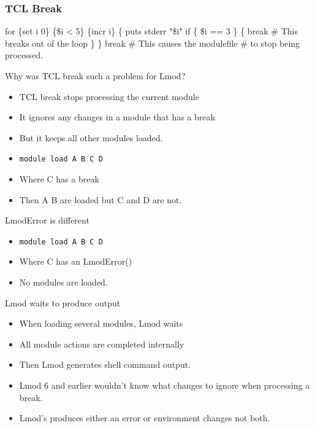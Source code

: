 \documentclass{beamer}
\begin{document}
\begin{frame}[fragile]
    \frametitle{TCL Break}
 {\small
   \begin{semiverbatim}
for \{set i 0\} \{\$i < 5\} \{incr i\} \{
  puts stderr "\$i"
  if \{ \$i == 3 \} \{
      break  # This breaks out of the loop
  \}
\}
break # This causes the modulefile
      # to stop being processed.       
    \end{semiverbatim}
}
\end{frame}

\begin{frame}{Why was TCL break such a problem for Lmod?}
  \begin{itemize}
    \item TCL break stops processing the current module
    \item It ignores any changes in a module that has a break
    \item But it keeps all other modules loaded.
    \item {\color{blue} \texttt{module load A B C D}} 
    \item Where C has a break
    \item Then A B are loaded but C and D are not.
  \end{itemize}
\end{frame}

\begin{frame}{LmodError is different}
  \begin{itemize}
    \item {\color{blue} \texttt{module load A B C D}} 
    \item Where C has an LmodError()
    \item No modules are loaded.
  \end{itemize}
\end{frame}

\begin{frame}{Lmod waits to produce output}
  \begin{itemize}
    \item When loading several modules, Lmod waits
    \item All module actions are completed internally
    \item Then Lmod generates shell command output.
    \item Lmod 6 and earlier wouldn't know what changes to ignore when
      processing a break.
    \item Lmod's produces either an error or environment changes
      not both.
  \end{itemize}
\end{frame}
\end{document}
